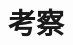 \documentclass[a4paper, 11pt]{ltjsarticle}
\begin{document}
\clearpage
\section{考察}





\end{document}
